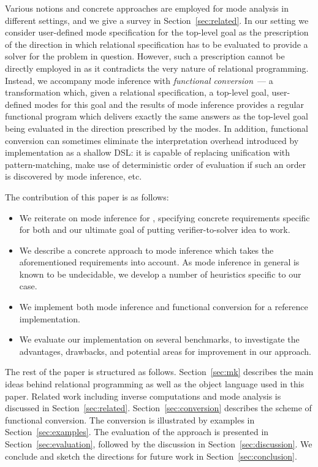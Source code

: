 Various notions and concrete approaches are employed for mode analysis in different settings, and we give a survey in Section~\ref{sec:related}.
In our setting we consider user-defined mode specification for the top-level goal as the prescription of the direction in which relational specification has to be evaluated to provide a solver for the problem in question.
However, such a prescription cannot be directly employed in \mk as it contradicts the very nature of relational programming.
Instead, we accompany mode inference with \emph{functional conversion}~--- a transformation which, given a relational specification, a top-level goal, user-defined modes for this goal and the results of mode inference provides a regular functional program which delivers exactly the same answers as the top-level goal being evaluated in the direction prescribed by the modes.
In addition, functional conversion can sometimes eliminate the interpretation overhead introduced by \mk implementation as a shallow DSL: it is capable of replacing unification with pattern-matching, make use of deterministic order of evaluation if such an order is discovered by mode inference, etc.

The contribution of this paper is as follows:

\begin{itemize}
\item We reiterate on mode inference for \mk, specifying concrete requirements specific for both \mk and our ultimate goal of putting verifier-to-solver idea to work.
\item We describe a concrete approach to mode inference which takes the aforementioned requirements into account. As mode inference in general is known to be undecidable, we develop a number of heuristics specific to our case.
\item We implement both mode inference and functional conversion for a reference \mk implementation.
\item We evaluate our implementation on several benchmarks, to investigate the advantages, drawbacks, and potential areas for improvement in our approach.
\end{itemize}

The rest of the paper is structured as follows.
Section~\ref{sec:mk} describes the main ideas behind relational programming as well as the object language used in this paper.
Related work including inverse computations and mode analysis is discussed in Section~\ref{sec:related}.
Section~\ref{sec:conversion} describes the scheme of functional conversion.
The conversion is illustrated by examples in Section~\ref{sec:examples}.
The evaluation of the approach is presented in Section~\ref{sec:evaluation}, followed by the discussion in Section~\ref{sec:discussion}.
We conclude and sketch the directions for future work in Section~\ref{sec:conclusion}.
